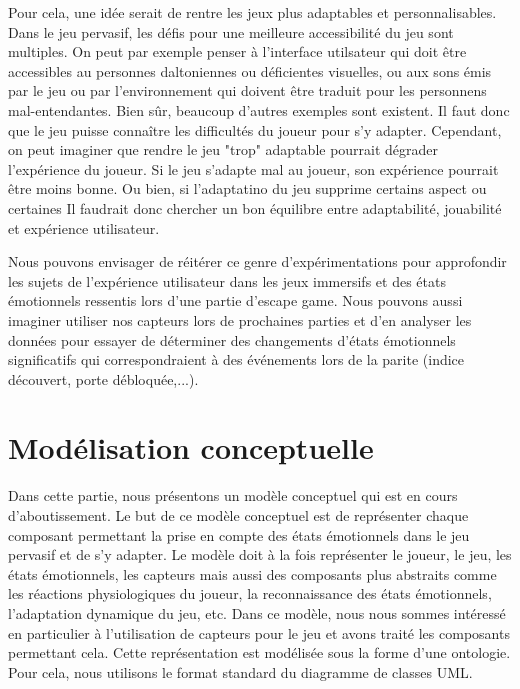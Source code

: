 \documentclass[11pt]{article}
\begin{document}
		Pour cela, une idée serait de rentre les jeux plus adaptables et personnalisables.
		Dans le jeu pervasif, les défis pour une meilleure accessibilité du jeu sont multiples.
		On peut par exemple penser à l'interface utilsateur qui doit être accessibles au personnes daltoniennes ou déficientes visuelles, ou aux sons émis par le jeu ou par l'environnement qui doivent être traduit pour les personnens mal-entendantes.
		Bien sûr, beaucoup d'autres exemples sont existent.
		Il faut donc que le jeu puisse connaître les difficultés du joueur pour s'y adapter.
		Cependant, on peut imaginer que rendre le jeu "trop" adaptable pourrait dégrader l'expérience du joueur.
		Si le jeu s'adapte mal au joueur, son expérience pourrait être moins bonne.
		Ou bien, si l'adaptatino du jeu supprime certains aspect ou certaines 
		Il faudrait donc chercher un bon équilibre entre adaptabilité, jouabilité et expérience utilisateur.\par
		Nous pouvons envisager de réitérer ce genre d'expérimentations pour approfondir les sujets de l'expérience utilisateur dans les jeux immersifs et des états émotionnels ressentis lors d'une partie d'escape game.
		Nous pouvons aussi imaginer utiliser nos capteurs lors de prochaines parties et d'en analyser les données pour essayer de déterminer des changements d'états émotionnels significatifs qui correspondraient à des événements lors de la parite (indice découvert, porte débloquée,...).

\section{Modélisation conceptuelle}\label{sec:modelisation}
	Dans cette partie, nous présentons un modèle conceptuel qui est en cours d'aboutissement.
	Le but de ce modèle conceptuel est de représenter chaque composant permettant la prise en compte des états émotionnels dans le jeu pervasif et de s'y adapter.
	Le modèle doit à la fois représenter le joueur, le jeu, les états émotionnels, les capteurs mais aussi des composants plus abstraits comme les réactions physiologiques du joueur, la reconnaissance des états émotionnels, l'adaptation dynamique du jeu, etc.
	Dans ce modèle, nous nous sommes intéressé en particulier à l'utilisation de capteurs pour le jeu et avons traité les composants permettant cela.
	Cette représentation est modélisée sous la forme d'une ontologie.
	Pour cela, nous utilisons le format standard du diagramme de classes UML.
\end{document}
